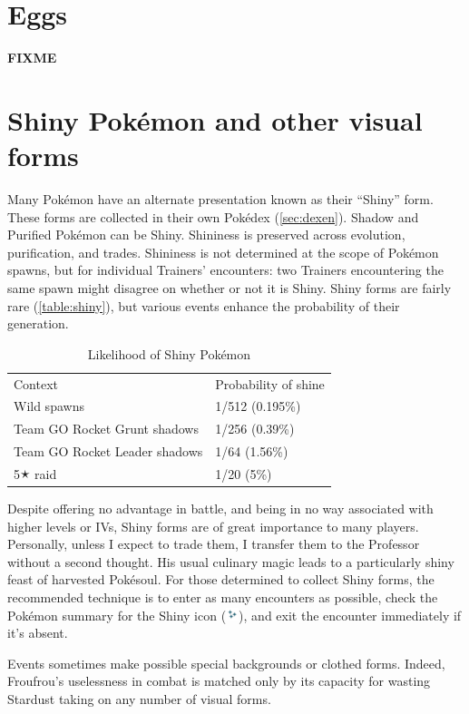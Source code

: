 \section{Eggs}
\label{sec:eggs}
\textbf{FIXME}

\section{Shiny Pokémon and other visual forms}
\label{sec:shiny}
Many Pokémon have an alternate presentation known as their ``Shiny'' form.
These forms are collected in their own Pokédex (\autoref{sec:dexen}).
Shadow and Purified Pokémon can be Shiny.
Shininess is preserved across evolution, purification, and trades.
Shininess is not determined at the scope of Pokémon spawns, but for individual
  Trainers' encounters: two Trainers encountering the same spawn might disagree
  on whether or not it is Shiny.
Shiny forms are fairly rare (\autoref{table:shiny}), but various events
  enhance the probability of their generation.
\begin{table}[ht]
\begin{center}
\begin{tabular}{ll}
Context & Probability of shine \\
\Midrule
  Wild spawns & 1/512 (0.195\%) \\
  Team GO Rocket Grunt shadows & 1/256 (0.39\%) \\
  Team GO Rocket Leader shadows & 1/64 (1.56\%) \\
  5🟉 raid & 1/20 (5\%) \\
\end{tabular}
\end{center}
\caption{Likelihood of Shiny Pokémon}
\label{table:shiny}
\end{table}

Despite offering no advantage in battle, and being in no way associated with
  higher levels or IVs, Shiny forms are of great importance to many players.
Personally, unless I expect to trade them, I transfer them to the Professor
  without a second thought.
His usual culinary magic leads to a particularly shiny feast of harvested Pokésoul.
For those determined to collect Shiny forms, the recommended technique
  is to enter as many encounters as possible, check the Pokémon summary
  for the Shiny icon (\includegraphics[width=1em,keepaspectratio]{images/shiny.png}),
  and exit the encounter immediately if it's absent.

Events sometimes make possible special backgrounds or clothed forms.
Indeed, Froufrou's uselessness in combat is matched only by its
  capacity for wasting Stardust taking on any number of visual forms.
